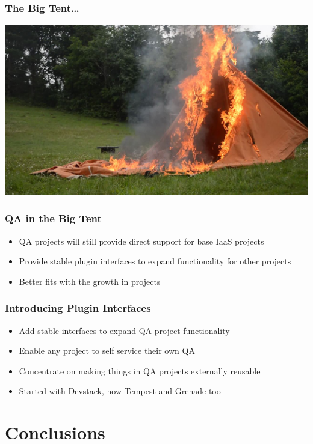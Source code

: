 \documentclass[aspectratio=169,11pt,hyperref={colorlinks=true}]{beamer}
\begin{document}
\begin{frame}
    \frametitle{The Big Tent\ldots}
    \begin{center}
        \includegraphics[width=.9\textwidth]{Burning_Tent.jpg}
    \end{center}
\end{frame}

\begin{frame}
    \frametitle{QA in the Big Tent}
    \begin{itemize}
        \item QA projects will still provide direct support for base IaaS projects
        \item Provide stable plugin interfaces to expand functionality for other projects
        \item Better fits with the growth in projects
    \end{itemize}
\end{frame}

\begin{frame}
    \frametitle{Introducing Plugin Interfaces}
    \begin{itemize}
        \item Add stable interfaces to expand QA project functionality
        \item Enable any project to self service their own QA
        \item Concentrate on making things in QA projects externally reusable
        \item Started with Devstack, now Tempest and Grenade too
    \end{itemize}
\end{frame}

\section{Conclusions}
\end{document}

